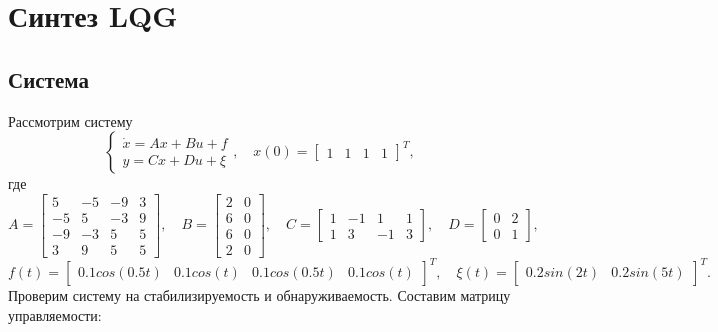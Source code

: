 \newpage \section{Синтез LQG}
\subsection{Система}
Рассмотрим систему
\begin{equation}
    \label{eq:sys3}
    \begin{cases}
        \dot x=Ax+Bu+f\\
        y=Cx+Du+\xi
    \end{cases},\quad
    x(0)=\begin{bmatrix}
        1&1&1&1
    \end{bmatrix}^T,
\end{equation}
где
\begin{equation*}
    A=\begin{bmatrix}
        5 & -5 & -9 & 3 \\
        -5 & 5 & -3 & 9 \\
        -9 & -3 & 5 & 5 \\
        3 & 9 & 5 & 5
    \end{bmatrix},\quad
    B=\begin{bmatrix}
        2 & 0 \\
        6 & 0 \\
        6 & 0 \\
        2 & 0
    \end{bmatrix},\quad
    C=\begin{bmatrix}
        1 & -1 & 1 & 1 \\
        1 & 3 & -1 & 3
    \end{bmatrix},\quad
    D=\begin{bmatrix}
        0 & 2 \\
        0 & 1
    \end{bmatrix},
\end{equation*}
\begin{equation*}
    f(t)=\begin{bmatrix}
        0.1cos(0.5t) & 0.1cos(t) & 0.1cos(0.5t) & 0.1cos(t)
    \end{bmatrix}^T,\quad 
    \xi(t)=\begin{bmatrix}
        0.2sin(2t) & 0.2sin(5t)
    \end{bmatrix}^T.
\end{equation*}
Проверим систему на стабилизируемость и обнаруживаемость.
Составим матрицу управляемости:
